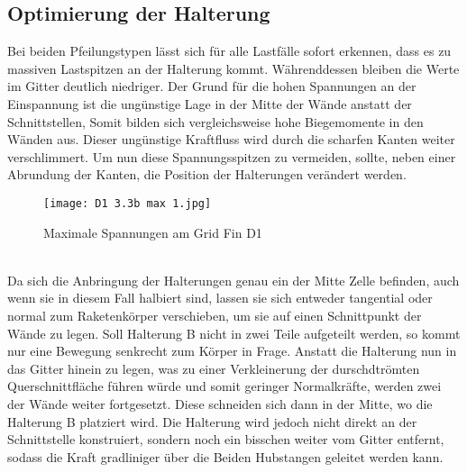 \subsection{Optimierung der Halterung}
Bei beiden Pfeilungstypen lässt sich für alle Lastfälle sofort erkennen, dass es zu massiven Lastspitzen an der Halterung kommt. Währenddessen bleiben die Werte im Gitter deutlich niedriger. Der Grund für die hohen Spannungen an der Einspannung ist die ungünstige Lage in der Mitte der Wände anstatt der Schnittstellen, Somit bilden sich vergleichsweise hohe Biegemomente in den Wänden aus. Dieser ungünstige Kraftfluss wird durch die scharfen Kanten weiter verschlimmert. Um nun diese Spannungsspitzen zu vermeiden, sollte, neben einer Abrundung der Kanten, die Position der Halterungen verändert werden.
\begin{figure}[h] 
	\centering
	\texttt{[image: D1 3.3b max 1.jpg]}
	\caption{Maximale Spannungen am Grid Fin D1}
\end{figure}\\
Da sich die Anbringung der Halterungen genau ein der Mitte Zelle befinden, auch wenn sie in diesem Fall halbiert sind, lassen sie sich entweder tangential oder normal zum Raketenkörper verschieben, um sie auf einen Schnittpunkt der Wände zu legen. Soll Halterung B nicht in zwei Teile aufgeteilt werden, so kommt nur eine Bewegung senkrecht zum Körper in Frage. Anstatt die Halterung nun in das Gitter hinein zu legen, was zu einer Verkleinerung der durschdtrömten Querschnittfläche führen würde und somit geringer Normalkräfte, werden zwei der Wände weiter fortgesetzt. Diese schneiden sich dann in der Mitte, wo die Halterung B platziert wird. Die Halterung wird jedoch nicht direkt an der Schnittstelle konstruiert, sondern noch ein bisschen weiter vom Gitter entfernt, sodass die Kraft gradliniger über die Beiden Hubstangen geleitet werden kann.


